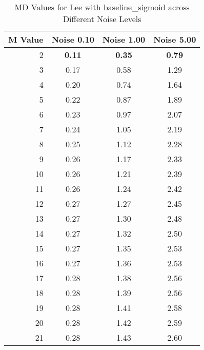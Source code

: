    \begin{table}[htb]
       \small

    \centering 
    \begin{tabular}{|r|ccc|}\hline
   M Value &  Noise 0.10 &  Noise 1.00 &  Noise 5.00 \\ \hline 
      2 &  \textbf{0.11} &  \textbf{0.35} &  \textbf{0.79}  \\ \hline 
      3 &  0.17 &  0.58 &  1.29  \\ \hline 
      4 &  0.20 &  0.74 &  1.64  \\ \hline 
      5 &  0.22 &  0.87 &  1.89  \\ \hline 
      6 &  0.23 &  0.97 &  2.07  \\ \hline 
      7 &  0.24 &  1.05 &  2.19  \\ \hline 
      8 &  0.25 &  1.12 &  2.28  \\ \hline 
      9 &  0.26 &  1.17 &  2.33  \\ \hline 
      10 &  0.26 &  1.21 &  2.39  \\ \hline 
      11 &  0.26 &  1.24 &  2.42  \\ \hline 
      12 &  0.27 &  1.27 &  2.45  \\ \hline 
      13 &  0.27 &  1.30 &  2.48  \\ \hline 
      14 &  0.27 &  1.32 &  2.50  \\ \hline 
      15 &  0.27 &  1.35 &  2.53  \\ \hline 
      16 &  0.27 &  1.36 &  2.53  \\ \hline 
      17 &  0.28 &  1.38 &  2.56  \\ \hline 
      18 &  0.28 &  1.39 &  2.56  \\ \hline 
      19 &  0.28 &  1.41 &  2.58  \\ \hline 
      20 &  0.28 &  1.42 &  2.59  \\ \hline 
      21 &  0.28 &  1.43 &  2.60  \\ \hline 
    \end{tabular}
    \caption{MD Values for Lee with baseline_sigmoid across Different Noise Levels}
    \end{table}


